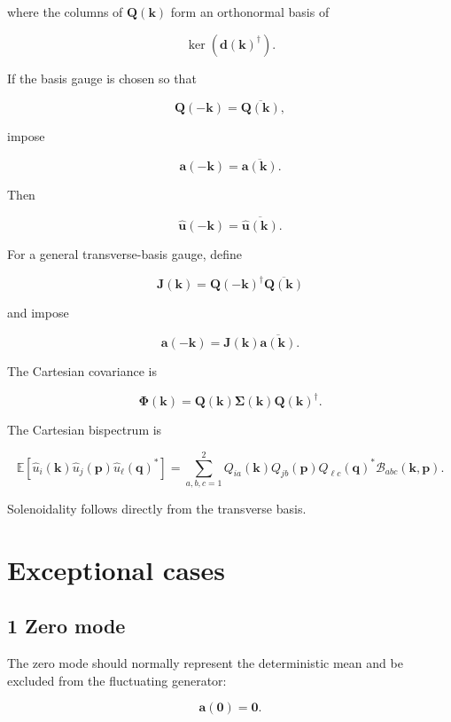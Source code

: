 \documentclass[
  11pt,
  a4paper,
]{article}
\begin{document}
where the columns of \(\boldsymbol Q(\boldsymbol k)\) form an orthonormal
basis of

\[
\ker\!\left(\boldsymbol d(\boldsymbol k)^\dagger\right).
\]

If the basis gauge is chosen so that

\[
\boldsymbol Q(-\boldsymbol k)
=
\overline{\boldsymbol Q(\boldsymbol k)},
\]

impose

\[
\boldsymbol a(-\boldsymbol k)
=
\overline{\boldsymbol a(\boldsymbol k)}.
\]

Then

\[
\widehat{\boldsymbol u}(-\boldsymbol k)
=
\overline{\widehat{\boldsymbol u}(\boldsymbol k)}.
\]

For a general transverse-basis gauge, define

\[
\boldsymbol J(\boldsymbol k)
=
\boldsymbol Q(-\boldsymbol k)^\dagger
\overline{\boldsymbol Q(\boldsymbol k)}
\]

and impose

\[
\boldsymbol a(-\boldsymbol k)
=
\boldsymbol J(\boldsymbol k)
\overline{\boldsymbol a(\boldsymbol k)}.
\]

The Cartesian covariance is

\[
\boldsymbol\Phi(\boldsymbol k)
=
\boldsymbol Q(\boldsymbol k)
\boldsymbol\Sigma(\boldsymbol k)
\boldsymbol Q(\boldsymbol k)^\dagger.
\]

The Cartesian bispectrum is

\[
\mathbb E[
\widehat u_i(\boldsymbol k)
\widehat u_j(\boldsymbol p)
\widehat u_\ell(\boldsymbol q)^*
]
=
\sum_{a,b,c=1}^{2}
Q_{ia}(\boldsymbol k)
Q_{jb}(\boldsymbol p)
Q_{\ell c}(\boldsymbol q)^*
\mathcal B_{abc}(\boldsymbol k,\boldsymbol p).
\]

Solenoidality follows directly from the transverse basis.

\section{Exceptional cases}\label{exceptional-cases}

\subsection{1 Zero mode}\label{zero-mode}

The zero mode should normally represent the deterministic mean and be
excluded from the fluctuating generator:

\[
\boldsymbol a(\boldsymbol0)
=
\boldsymbol0.
\]
\end{document}
